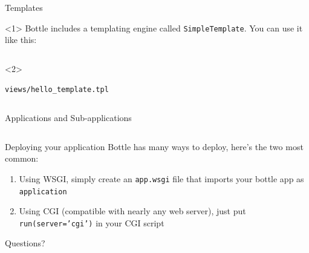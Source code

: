 \documentclass{lug}
\begin{document}
\begin{frame}{Templates}
    \begin{onlyenv}<1>
    Bottle includes a templating engine called \texttt{SimpleTemplate}. You can
    use it like this:
    \end{onlyenv}

    {\small
    \inputminted{python3}{examples/template.py}
    }

    \begin{onlyenv}<2>
    \begin{block}{\texttt{views/hello\_template.tpl}}
        \small
        \inputminted{html}{examples/hello_template.tpl}
    \end{block}
    \end{onlyenv}
\end{frame}

\begin{frame}{Applications and Sub-applications}
    \small
    \inputminted{python3}{examples/apps.py}
\end{frame}

\begin{frame}{Deploying your application}
    Bottle has many ways to deploy, here's the two most common:

    \begin{enumerate}
        \item Using WSGI, simply create an \texttt{app.wsgi} file that imports
            your bottle app as \texttt{application}
        \item Using CGI (compatible with nearly any web server), just put
            \texttt{run(server='cgi')} in your CGI script
    \end{enumerate}
\end{frame}

\begin{frame}[standout]
    \Huge
    Questions?
\end{frame}
\end{document}
